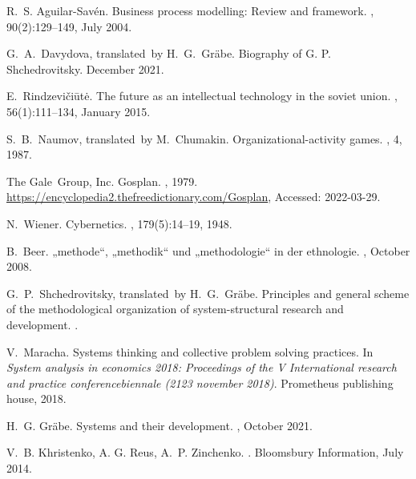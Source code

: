 \documentclass[11pt,a4paper]{article}
\begin{document}
\thispagestyle{empty}

\begin{thebibliography}{10}

R.~S. Aguilar-Sav{\'{e}}n.
\newblock Business process modelling: Review and framework.
, 90(2):129--149,
  July 2004.

G.~A.~Davydova{,} translated~by H.~G.~Gräbe.
\newblock Biography of {G}. {P}. {S}hchedrovitsky.
\newblock December 2021.

E.~Rindzevi{\v{c}}i{\={u}}t{\.{e}}.
\newblock The future as an intellectual technology in the soviet union.
, 56(1):111--134, January 2015.

S.~B.~Naumov{,} translated~by M.~Chumakin.
\newblock Organizational-activity games.
, 4, 1987.

The Gale~Group{,} Inc.
\newblock Gosplan.
, 1979.
\newblock \url{https://encyclopedia2.thefreedictionary.com/Gosplan}, Accessed:
  2022-03-29.

N.~Wiener.
\newblock Cybernetics.
, 179(5):14--19, 1948.

B.~Beer.
\newblock „methode“, „methodik“ und „methodologie“ in der
  ethnologie.
, October 2008.

G.~P.~Shchedrovitsky{,} translated~by H.~G.~Gräbe.
\newblock Principles and general scheme of the methodological organization of
  system-structural research and development.
.

V.~Maracha.
\newblock Systems thinking and collective problem solving practices.
\newblock In {\em System analysis in economics {\textendash} 2018: Proceedings
  of the V International research and practice conference{\textendash}biennale
  (21{\textendash}23 november 2018)}. Prometheus publishing house, 2018.

H.~G. Gräbe.
\newblock Systems and their development.
, October 2021.

V.~B. Khristenko{,} A. G. Reus{,} A.~P. Zinchenko.
.
\newblock Bloomsbury Information, July 2014.


\end{thebibliography}
\end{document}
